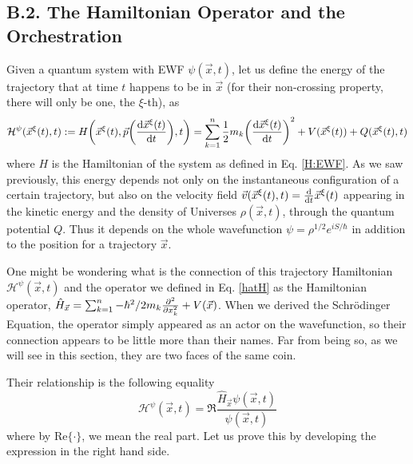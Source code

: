 \documentclass[11pt, a4paper]{article} %
\newcommand{\h}{\mathcal{H}}
\begin{document}

\subsection*{B.2. The Hamiltonian Operator and the Orchestration}
Given a quantum system with EWF $\psi(\vec{x},t)$, let us define the energy of the trajectory that at time $t$ happens to be in $\vec{x}$ (for their non-crossing property, there will only be one, the $\xi$-th), as
\begin{equation}
\h^\psi(\vec{x}^\xi(t), t):=H\qty(\vec{x}^\xi(t), \vec{p}\qty(\dv{\vec{x}^\xi(t)}{t}), t)=\sum_{k=1}^n \frac{1}{2}m_k\qty(\dv{\vec{x}^\xi(t)}{t})^2+V(\vec{x}^\xi(t))+Q(\vec{x}^\xi(t),t)
\end{equation}
where $H$ is the Hamiltonian of the system as defined in Eq. \eqref{H:EWF}. As we saw previously, this energy depends not only on the instantaneous configuration of a certain trajectory, but also on the velocity field $\vec{v}(\vec{x}^\xi(t),t)=\dv{}{t}\vec{x}^\xi(t)$ appearing in the kinetic energy and the density of Universes $\rho(\vec{x},t)$, through the quantum potential $Q$. Thus it depends on the whole wavefunction $\psi=\rho^{1/2}e^{iS/\hbar}$ in addition to the position for a trajectory $\vec{x}$.

One might be wondering what is the connection of this trajectory Hamiltonian $\h^\psi(\vec{x},t)$ and the operator we defined in Eq. \eqref{hatH} as the Hamiltonian operator, $\hat{H}_{\vec{x}}=\sum_{k=1}^n-\hbar^2/2m_k\pdv[2]{}{x_k}+V(\vec{x})$. When we derived the Schrödinger Equation, the operator simply appeared as an actor on the wavefunction, so their connection appears to be little more than their names. Far from being so, as we will see in this section, they are two faces of the same coin.

Their relationship is the following equality
\begin{equation}\label{117}
\h^\psi(\vec{x},t)=\Re{\frac{\hat{H}_{\vec{x}}\psi(\vec{x},t)}{\psi(\vec{x},t)}}
\end{equation}
where by Re$\{\cdot\}$, we mean the real part. Let us prove this by developing the expression in the right hand side.
\end{document}
